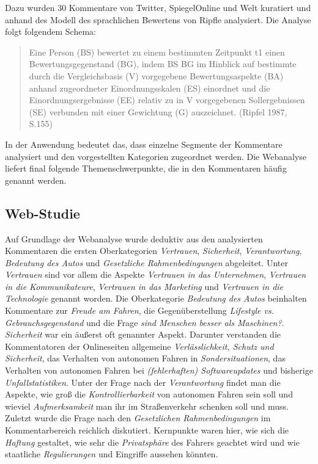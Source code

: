 \documentclass[12pt]{article}
\begin{document}
Dazu wurden 30 Kommentare von Twitter, SpiegelOnline und Welt kuratiert und anhand des Modell des sprachlichen Bewertens von Ripfle analysiert. Die Analyse folgt folgendem Schema:

\begin{quote}
  Eine Person (BS) bewertet zu einem bestimmten Zeitpunkt t1 einen Bewertungsgegenstand (BG), indem BS BG im Hinblick auf bestimmte durch die Vergleichsbasis (V) vorgegebene Bewertungsaspekte (BA) anhand zugeordneter Einordnungsskalen (ES) einordnet und die Einordnungsergebnisse (EE) relativ zu in V vorgegebenen Sollergebnissen (SE) verbunden mit einer Gewichtung (G) auszeichnet. (Ripfel 1987, S.155)
\end{quote}

In der Anwendung bedeutet das, dass einzelne Segmente der Kommentare analysiert und den vorgestellten Kategorien zugeordnet werden. Die Webanalyse liefert final folgende Themenschwerpunkte, die in den Kommentaren häufig genannt werden.

\subsection{Web-Studie}

Auf Grundlage der Webanalyse wurde deduktiv aus den analysierten Kommentaren die ersten Oberkategorien \emph{Vertrauen}, \emph{Sicherheit}, \emph{Verantwortung}, \emph{Bedeutung des Autos} und \emph{Gesetzliche Rahmenbedingungen} abgeleitet.
Unter \emph{Vertrauen} sind vor allem die Aspekte \emph{Vertrauen in das Unternehmen}, \emph{Vertrauen in die Kommunikateure}, \emph{Vertrauen in das Marketing} und \emph{Vertrauen in die Technologie} genannt worden.
Die Oberkategorie \emph{Bedeutung des Autos} beinhalten Kommentare zur \emph{Freude am Fahren}, die Gegenüberstellung \emph{Lifestyle vs. Gebrauchsgegenstand} und die Frage \emph{sind Menschen besser als Maschinen?}.
\emph{Sicherheit} war ein äußerst oft genannter Aspekt. Darunter verstanden die Kommentatoren der Onlineseiten allgemeine \emph{Verlässlichkeit, Schutz und Sicherheit}, das Verhalten von autonomen Fahren in \emph{Sondersituationen}, das Verhalten von autonomen Fahren bei \emph{(fehlerhaften) Softwareupdates} und bisherige \emph{Unfallstatistiken}.
Unter der Frage nach der \emph{Verantwortung} findet man die Aspekte, wie groß die \emph{Kontrollierbarkeit} von autonomen Fahren sein soll und wieviel \emph{Aufmerksamkeit} man ihr im Straßenverkehr schenken soll und muss.
Zuletzt wurde die Frage nach den \emph{Gesetzlichen Rahmenbedingungen} im Kommentarbereich reichlich diskutiert. Kernpunkte waren hier, wie sich die \emph{Haftung} gestaltet, wie sehr die \emph{Privatsphäre} des Fahrers geachtet wird und wie staatliche \emph{Regulierungen} und Eingriffe aussehen könnten.
\end{document}
